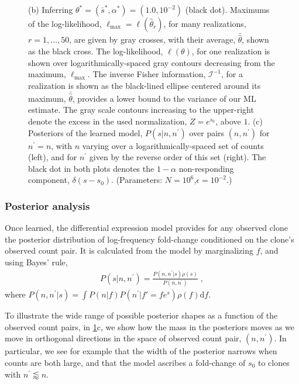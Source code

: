 \documentclass[letterpaper,english,prl,reprint,longbibliography]{revtex4-1} %
\begin{document}
\begin{figure}[tbph!]
{(b) Inferring $\theta^*=(\bar{s}^*,\alpha^* )=(1.0,10^{-2})$ (black dot). 
Maximums of the log-likelihood, $\ell_\textrm{max}=\ell(\hat{\theta}_r)$, for many realizations, $r=1,\dots,50$, are given by gray crosses, with their average, $\bar{\hat{\theta}}$, shown as the black cross. 
The log-likelihood, $\ell(\theta)$, for one realization is shown over logarithmically-spaced gray contours decreasing from the maximum, $\ell_{\textrm{max}}$. 
The inverse Fisher information, $\mathcal{I}^{-1}$, for a realization is shown as the black-lined ellipse centered around its maximum, $\bar{\hat{\theta}}$, provides a lower bound to the variance of our ML estimate. 
The gray scale contours increasing to the upper-right denote the excess in the used normalization, $Z=e^{s_0}$, above $1$. (c) Posteriors of the learned model, $P(s|n,n^{\prime})$ over pairs $(n,n^{\prime})$ for $n^{\prime}=n$, with $n$ varying over a logarithmically-spaced set of counts (left), and for $n^{\prime}$ given by the reverse order of this set (right). The black dot in both plots denotes the $1-\alpha$ non-responding component, $\delta(s-s_0)$.
(Parameters: $N=10^6$,$\epsilon=10^{-2}$.)
\label{fig:diffexpr_ex1}}
\end{figure}

\subsubsection*{Posterior analysis}
Once learned, the differential expression model provides for any observed clone the posterior distribution of log-frequency fold-change conditioned on the clone's observed count pair. 
It is calculated from the model by marginalizing $f$, and using Bayes' rule, 
\begin{align}
	P(s|n,n^{\prime})=\frac{P(n,n^{\prime}|s)\rho(s)}{P(n,n^{\prime})}\;,
\end{align}
where $P(n,n^{\prime}|s)=\int P(n|f)P(n^{\prime}|f'=fe^s)\rho(f)\textrm{d}f$. 

To illustrate the wide range of possible posterior shapes as a function of the observed count pairs, in \cref{fig:diffexpr_ex1}c, we show how the mass in the posteriors moves as we move in orthogonal directions in the space of observed count pair, $(n,n^{\prime})$. In particular, we see for example that the width of the posterior narrows when counts are both large, and that the model ascribes a fold-change of $s_0$ to clones with $n^{\prime} \lessapprox n$.
\end{document}
